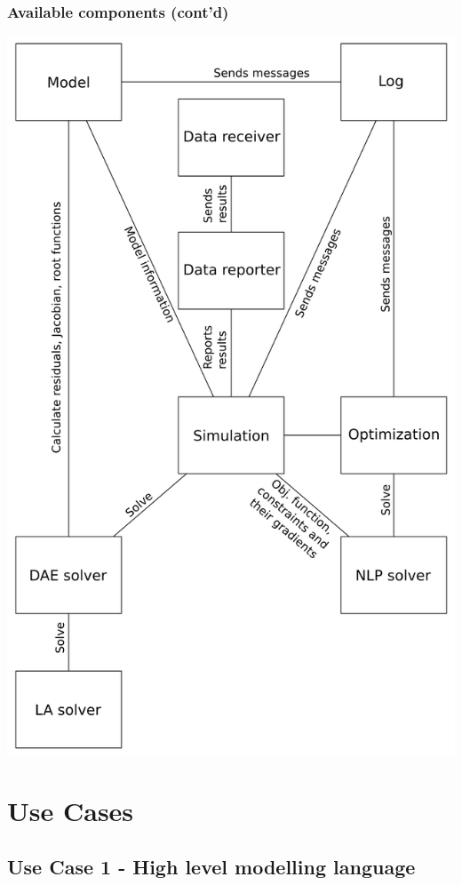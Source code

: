 \documentclass[compress,newPxFont,sthlmFooter]{beamer}
\begin{document}
\begin{frame}
\frametitle{Available components (cont'd)}
\begin{center}
  \includegraphics[height=0.7\paperheight]{../_static/daetools-architecture.png}
\end{center}
\end{frame}

\section{Use Cases} 

\subsection{Use Case 1 - High level modelling language}
\begin{frame}
\frametitle{}
\end{frame}
\end{document}
